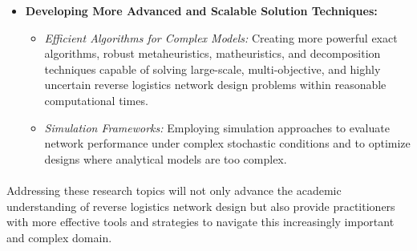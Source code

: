 \begin{itemize}[label=, leftmargin=2mm]
    \item \textbf{Developing More Advanced and Scalable Solution Techniques:}
        \begin{itemize}
            \item \textit{Efficient Algorithms for Complex Models:} Creating more powerful exact algorithms, robust metaheuristics, matheuristics, and decomposition techniques capable of solving large-scale, multi-objective, and highly uncertain reverse logistics network design problems within reasonable computational times.
            \item \textit{Simulation Frameworks:} Employing simulation approaches to evaluate network performance under complex stochastic conditions and to optimize designs where analytical models are too complex.
        \end{itemize}
\end{itemize}

\paragraph{} Addressing these research topics will not only advance the academic understanding of reverse logistics network design but also provide practitioners with more effective tools and strategies to navigate this increasingly important and complex domain.